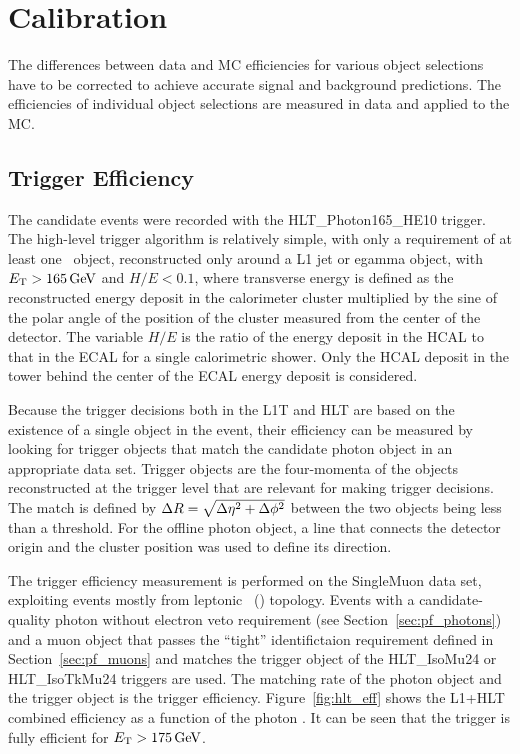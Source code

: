\chapter{Calibration}
\label{chap:calibration}

The differences between data and MC efficiencies for various object selections have to be corrected to achieve accurate signal and background predictions.
The efficiencies of individual object selections are measured in data and applied to the MC.

\section{Trigger Efficiency}
\label{sec:triggereff}

The candidate events were recorded with the HLT\_Photon165\_HE10 trigger.
The high-level trigger algorithm is relatively simple, with only a requirement of at least one \egamma\ object, reconstructed only around a L1 jet or egamma object, with $E_{\mathrm{T}} > 165\,\text{Ge\hspace{-.08em}V}$ and $H/E < 0.1$, where transverse energy \ET is defined as the reconstructed energy deposit in the calorimeter cluster multiplied by the sine of the polar angle of the position of the cluster measured from the center of the detector. 
The variable $H/E$ is the ratio of the energy deposit in the HCAL to that in the ECAL for a single calorimetric shower. 
Only the HCAL deposit in the tower behind the center of the ECAL energy deposit is considered.

Because the trigger decisions both in the L1T and HLT are based on the existence of a single object in the event, their efficiency can be measured by looking for trigger objects that match the candidate photon object in an appropriate data set. 
Trigger objects are the four-momenta of the objects reconstructed at the trigger level that are relevant for making trigger decisions. 
The match is defined by $\Delta R = \sqrt{\Delta \eta^2 + \Delta \phi^2}$ between the two objects being less than a threshold. 
For the offline photon object, a line that connects the detector origin and the cluster position was used to define its direction.

The trigger efficiency measurement is performed on the SingleMuon data set, exploiting events mostly from leptonic \ttbar\ (\Pe\Pgm) topology. 
Events with a candidate-quality photon without electron veto requirement (see Section~\ref{sec:pf_photons}) and a muon object that passes the ``tight''
identifictaion requirement defined in Section~\ref{sec:pf_muons} and matches the trigger object of the HLT\_IsoMu24 or HLT\_IsoTkMu24 triggers are used. 
The matching rate of the photon object and the trigger object is the trigger efficiency. 
Figure~\ref{fig:hlt_eff} shows the L1+HLT combined efficiency as a function of the photon \ET. 
It can be seen that the trigger is fully efficient for $E_{\mathrm{T}} > 175\,\text{Ge\hspace{-.08em}V}$.

